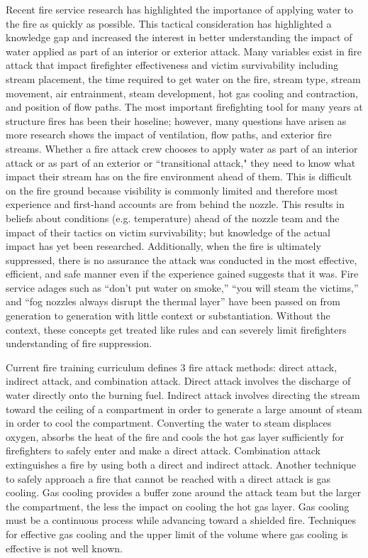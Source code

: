 \documentclass[12pt,oneside]{book}
\begin{document}
Recent fire service research has highlighted the importance of applying water to the fire as quickly as possible. This tactical consideration has highlighted a knowledge gap and increased the interest in better understanding the impact of water applied as part of an interior or exterior attack. Many variables exist in fire attack that impact firefighter effectiveness and victim survivability including stream placement, the time required to get water on the fire, stream type, stream movement, air entrainment, steam development, hot gas cooling and contraction, and position of flow paths. The most important firefighting tool for many years at structure fires has been their hoseline; however, many questions have arisen as more research shows the impact of ventilation, flow paths, and exterior fire streams. Whether a fire attack crew chooses to apply water as part of an interior attack or as part of an exterior or ``transitional attack," they need to know what impact their stream has on the fire environment ahead of them. This is difficult on the fire ground because visibility is commonly limited and therefore most experience and first-hand accounts are from behind the nozzle. This results in beliefs about conditions (e.g. temperature) ahead of the nozzle team and the impact of their tactics on victim survivability; but knowledge of the actual impact has yet been researched. Additionally, when the fire is ultimately suppressed, there is no assurance the attack was conducted in the most effective, efficient, and safe manner even if the experience gained suggests that it was. Fire service adages such as ``don't put water on smoke,'' ``you will steam the victims,'' and ``fog nozzles always disrupt the thermal layer'' have been passed on from generation to generation with little context or substantiation. Without the context, these concepts get treated like rules and can severely limit firefighters understanding of fire suppression.

Current fire training curriculum defines 3 fire attack methods: direct attack, indirect attack, and combination attack. Direct attack involves the discharge of water directly onto the burning fuel. Indirect attack involves directing the stream toward the ceiling of a compartment in order to generate a large amount of steam in order to cool the compartment. Converting the water to steam displaces oxygen, absorbs the heat of the fire and cools the hot gas layer sufficiently for firefighters to safely enter and make a direct attack. Combination attack extinguishes a fire by using both a direct and indirect attack. Another technique to safely approach a fire that cannot be reached with a direct attack is gas cooling. Gas cooling provides a buffer zone around the attack team but the larger the compartment, the less the impact on cooling the hot gas layer. Gas cooling must be a continuous process while advancing toward a shielded fire. Techniques for effective gas cooling and the upper limit of the volume where gas cooling is effective is not well known.  
\end{document}
